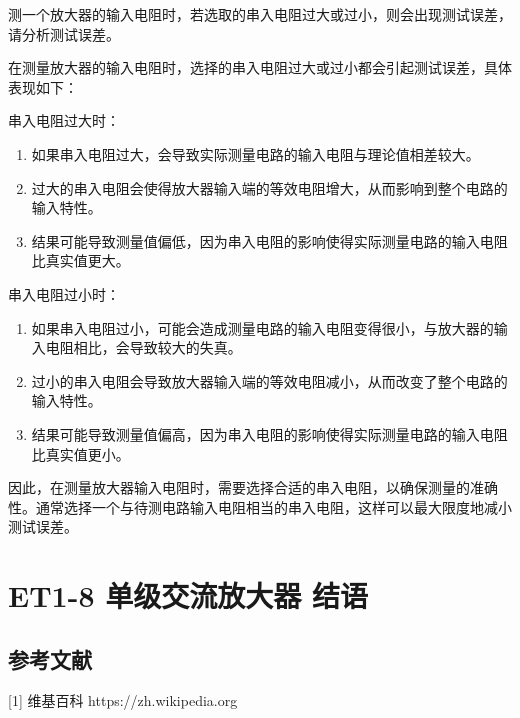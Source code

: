\documentclass[dvipsnames, svgnames,a4paper,11pt]{article}
\begin{document}
	\begin{question}
		测一个放大器的输入电阻时，若选取的串入电阻过大或过小，则会出现测试误差，请分析测试误差。
	\end{question}

	在测量放大器的输入电阻时，选择的串入电阻过大或过小都会引起测试误差，具体表现如下：

	串入电阻过大时：

	\begin{enumerate}
		\item 如果串入电阻过大，会导致实际测量电路的输入电阻与理论值相差较大。
		\item 过大的串入电阻会使得放大器输入端的等效电阻增大，从而影响到整个电路的输入特性。
		\item 结果可能导致测量值偏低，因为串入电阻的影响使得实际测量电路的输入电阻比真实值更大。
	\end{enumerate}

	串入电阻过小时：

	\begin{enumerate}
		\item 如果串入电阻过小，可能会造成测量电路的输入电阻变得很小，与放大器的输入电阻相比，会导致较大的失真。
		\item 过小的串入电阻会导致放大器输入端的等效电阻减小，从而改变了整个电路的输入特性。
		\item 结果可能导致测量值偏高，因为串入电阻的影响使得实际测量电路的输入电阻比真实值更小。
	\end{enumerate}
	
	因此，在测量放大器输入电阻时，需要选择合适的串入电阻，以确保测量的准确性。通常选择一个与待测电路输入电阻相当的串入电阻，这样可以最大限度地减小测试误差。
	
	
	
	\clearpage
	
	\section{ET1-8 单级交流放大器 \quad\heiti 结语}
	
	
	
	\subsection{参考文献}
	[1] 维基百科 https://zh.wikipedia.org
	
\end{document}
